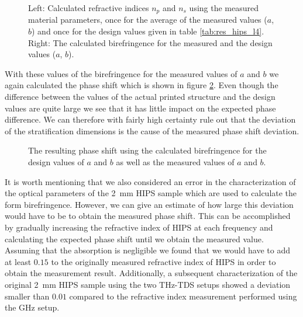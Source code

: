 \begin{figure}[H]
    \centering
    
    \caption{Left: Calculated refractive indices $n_p$ and $n_s$ using the measured material parameters, once for the average of the measured values ($a$, $b$) and once for the design values given in table \ref{tab:res_hips_l4}. Right: The calculated birefringence for the measured and the design values ($a$, $b$).}
    \label{fig:ri_stripe_err}
\end{figure}

With these values of the birefringence for the measured values of $a$ and $b$ we again calculated the phase shift which is shown in figure \ref{fig:delta_stripe_err}. Even though the difference between the values of the actual printed structure and the design values are quite large we see that it has little impact on the expected phase difference. We can therefore with fairly high certainty rule out that the deviation of the stratification dimensions is the cause of the measured phase shift deviation.

\begin{figure}[H]
    \centering
    
    \caption{The resulting phase shift using the calculated birefringence for the design values of $a$ and $b$ as well as the measured values of $a$ and $b$.}
    \label{fig:delta_stripe_err}
\end{figure}

It is worth mentioning that we also considered an error in the characterization of the optical parameters of the \SI{2}{\milli \meter} HIPS sample which are used to calculate the form birefringence. However, we can give an estimate of how large this deviation would have to be to obtain the measured phase shift. This can be accomplished by gradually increasing the refractive index of HIPS at each frequency and calculating the expected phase shift until we obtain the measured value. Assuming that the absorption is negligible we found that we would have to add at least $0.15$ to the originally measured refractive index of HIPS in order to obtain the measurement result. Additionally, a subsequent characterization of the original \SI{2}{\milli \meter} HIPS sample using the two THz-TDS setups showed a deviation smaller than $0.01$ compared to the refractive index measurement performed using the GHz setup.

